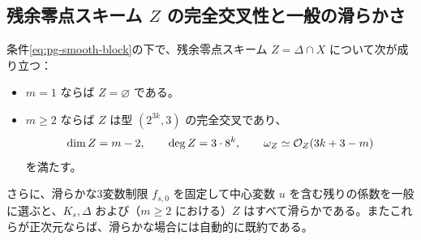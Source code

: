 \subsection{残余零点スキーム $Z$ の完全交叉性と一般の滑らかさ}
\begin{proposition}\label{prop:pg-zero-ci}
条件\eqref{eq:pg-smooth-block}の下で、残余零点スキーム $Z=\Delta\cap X$ について次が成り立つ：
\begin{itemize}
  \item $m=1$ ならば $Z=\varnothing$ である。
  \item $m\geq2$ ならば $Z$ は型 $(2^{3k},3)$ の完全交叉であり、
  \begin{equation}
  \dim Z=m-2,\qquad \deg Z=3\cdot8^k,\qquad
  \omega_Z\simeq\mathcal O_Z(3k+3-m)
  \end{equation}
  を満たす。
\end{itemize}
さらに、滑らかな3変数制限 $f_{s,0}$ を固定して中心変数 $u$ を含む残りの係数を一般に選ぶと、$K_s,\Delta$ および（$m\geq2$ における）$Z$ はすべて滑らかである。またこれらが正次元ならば、滑らかな場合には自動的に既約である。
\end{proposition}
